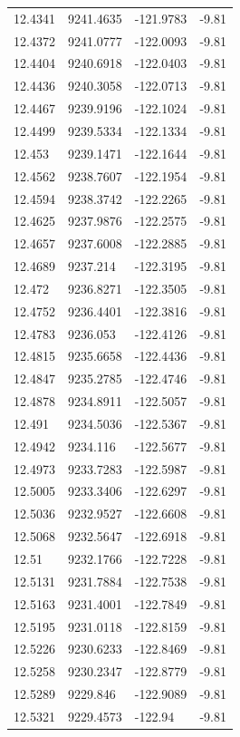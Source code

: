 \begin{table}[H]
\begin{tabular}{llll}
12.4341 & 9241.4635 & -121.9783 & -9.81 \\
12.4372 & 9241.0777 & -122.0093 & -9.81 \\
12.4404 & 9240.6918 & -122.0403 & -9.81 \\
12.4436 & 9240.3058 & -122.0713 & -9.81 \\
12.4467 & 9239.9196 & -122.1024 & -9.81 \\
12.4499 & 9239.5334 & -122.1334 & -9.81 \\
12.453 & 9239.1471 & -122.1644 & -9.81 \\
12.4562 & 9238.7607 & -122.1954 & -9.81 \\
12.4594 & 9238.3742 & -122.2265 & -9.81 \\
12.4625 & 9237.9876 & -122.2575 & -9.81 \\
12.4657 & 9237.6008 & -122.2885 & -9.81 \\
12.4689 & 9237.214 & -122.3195 & -9.81 \\
12.472 & 9236.8271 & -122.3505 & -9.81 \\
12.4752 & 9236.4401 & -122.3816 & -9.81 \\
12.4783 & 9236.053 & -122.4126 & -9.81 \\
12.4815 & 9235.6658 & -122.4436 & -9.81 \\
12.4847 & 9235.2785 & -122.4746 & -9.81 \\
12.4878 & 9234.8911 & -122.5057 & -9.81 \\
12.491 & 9234.5036 & -122.5367 & -9.81 \\
12.4942 & 9234.116 & -122.5677 & -9.81 \\
12.4973 & 9233.7283 & -122.5987 & -9.81 \\
12.5005 & 9233.3406 & -122.6297 & -9.81 \\
12.5036 & 9232.9527 & -122.6608 & -9.81 \\
12.5068 & 9232.5647 & -122.6918 & -9.81 \\
12.51 & 9232.1766 & -122.7228 & -9.81 \\
12.5131 & 9231.7884 & -122.7538 & -9.81 \\
12.5163 & 9231.4001 & -122.7849 & -9.81 \\
12.5195 & 9231.0118 & -122.8159 & -9.81 \\
12.5226 & 9230.6233 & -122.8469 & -9.81 \\
12.5258 & 9230.2347 & -122.8779 & -9.81 \\
12.5289 & 9229.846 & -122.9089 & -9.81 \\
12.5321 & 9229.4573 & -122.94 & -9.81 \\

\end{tabular}
\end{table}

